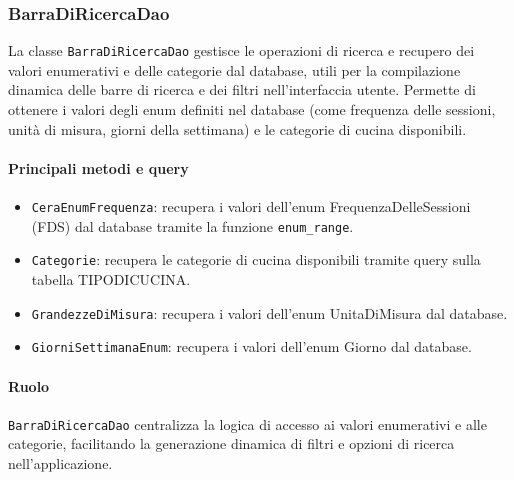 \subsubsection{BarraDiRicercaDao}
La classe \texttt{BarraDiRicercaDao} gestisce le operazioni di ricerca e recupero dei valori enumerativi e delle categorie dal database, utili per la compilazione dinamica delle barre di ricerca e dei filtri nell'interfaccia utente. Permette di ottenere i valori degli enum definiti nel database (come frequenza delle sessioni, unità di misura, giorni della settimana) e le categorie di cucina disponibili.

\paragraph{Principali metodi e query}
\begin{itemize}
    \item \texttt{CeraEnumFrequenza}: recupera i valori dell'enum FrequenzaDelleSessioni (FDS) dal database tramite la funzione \texttt{enum\_range}.
    \item \texttt{Categorie}: recupera le categorie di cucina disponibili tramite query sulla tabella TIPODICUCINA.
    \item \texttt{GrandezzeDiMisura}: recupera i valori dell'enum UnitaDiMisura dal database.
    \item \texttt{GiorniSettimanaEnum}: recupera i valori dell'enum Giorno dal database.
\end{itemize}

\paragraph{Ruolo}
\texttt{BarraDiRicercaDao} centralizza la logica di accesso ai valori enumerativi e alle categorie, facilitando la generazione dinamica di filtri e opzioni di ricerca nell'applicazione.

